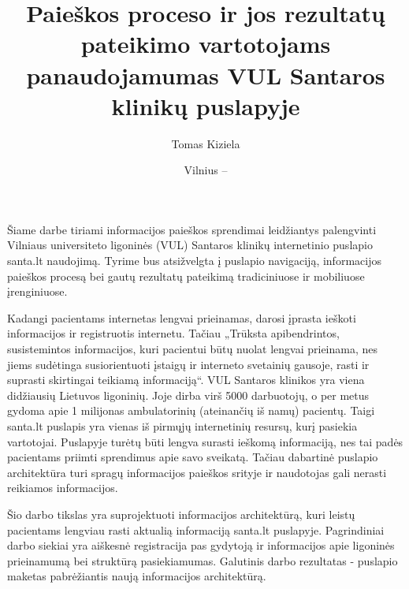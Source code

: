 \documentclass{VUMIFPSkursinis}
\title{Paieškos proceso ir jos rezultatų pateikimo vartotojams panaudojamumas VUL Santaros klinikų puslapyje}
\author{Tomas Kiziela}
\date{Vilnius – \the\year}
\begin{document}
	
\maketitle
\cleardoublepage{}
\setcounter{page}{2}

\tableofcontents

Šiame darbe tiriami informacijos paieškos sprendimai leidžiantys palengvinti Vilniaus universiteto ligoninės (VUL) Santaros klinikų internetinio puslapio santa.lt naudojimą. Tyrime bus atsižvelgta į puslapio navigaciją, informacijos paieškos procesą bei gautų rezultatų pateikimą tradiciniuose ir mobiliuose įrenginiuose.

Kadangi pacientams internetas lengvai prieinamas, darosi įprasta ieškoti informacijos ir registruotis internetu. Tačiau „Trūksta apibendrintos, susistemintos informacijos, kuri pacientui būtų nuolat lengvai prieinama, nes jiems sudėtinga susiorientuoti įstaigų ir interneto svetainių gausoje, rasti ir suprasti skirtingai teikiamą informaciją“\cite{AukšAudInstLt}. VUL Santaros klinikos yra viena didžiausių Lietuvos ligoninių. Joje dirba virš 5000 darbuotojų, o per metus gydoma apie 1 milijonas ambulatorinių (ateinančių iš namų) pacientų\cite{VulSkApieMusLt}. Taigi santa.lt puslapis yra vienas iš pirmųjų internetinių resursų, kurį pasiekia vartotojai. Puslapyje turėtų būti lengva surasti ieškomą informaciją, nes tai padės pacientams priimti sprendimus apie savo sveikatą. Tačiau dabartinė puslapio architektūra turi spragų informacijos paieškos srityje ir naudotojas gali nerasti reikiamos informacijos.

Šio darbo tikslas yra suprojektuoti informacijos architektūrą, kuri leistų pacientams lengviau rasti aktualią informaciją santa.lt puslapyje. Pagrindiniai darbo siekiai yra aiškesnė registracija pas gydytoją ir informacijos apie ligoninės prieinamumą bei struktūrą pasiekiamumas. Galutinis darbo rezultatas - puslapio maketas pabrėžiantis naują informacijos architektūrą.
\end{document}
